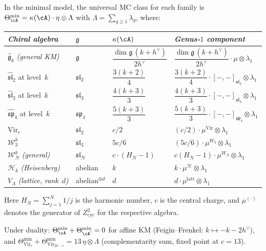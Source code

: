 \begin{corollary}\label{cor:explicit-theta-specializations}
In the minimal model, the universal MC class for each family is
$\Theta^{\min}_{\cA} = \kappa(\cA) \cdot \eta \otimes \Lambda$
with $\Lambda = \sum_{g\geq 1}\lambda_g$, where:
\begin{center}
\begin{tabular}{llll}
\toprule
\emph{Chiral algebra} & $\mathfrak{g}$ &
$\kappa(\cA)$ & \emph{Genus-$1$ component} \\
\midrule
$\widehat{\mathfrak{g}}_k$ \emph{(general KM)} &
$\mathfrak{g}$ &
$\dfrac{\dim\mathfrak{g}\,(k+h^\vee)}{2h^\vee}$ &
$\dfrac{\dim\mathfrak{g}\,(k+h^\vee)}{2h^\vee}
\cdot \mu \otimes \lambda_1$ \\[6pt]
$\widehat{\mathfrak{sl}}_2$ at level~$k$ &
$\mathfrak{sl}_2$ &
$\dfrac{3(k+2)}{4}$ &
$\dfrac{3(k+2)}{4}\cdot[-,-]_{\mathfrak{sl}_2}\otimes\lambda_1$ \\[6pt]
$\widehat{\mathfrak{sl}}_3$ at level~$k$ &
$\mathfrak{sl}_3$ &
$\dfrac{4(k+3)}{3}$ &
$\dfrac{4(k+3)}{3}\cdot[-,-]_{\mathfrak{sl}_3}\otimes\lambda_1$ \\[6pt]
$\widehat{\mathfrak{sp}}_4$ at level~$k$ &
$\mathfrak{sp}_4$ &
$\dfrac{5(k+3)}{3}$ &
$\dfrac{5(k+3)}{3}\cdot[-,-]_{\mathfrak{sp}_4}\otimes\lambda_1$ \\[6pt]
$\mathrm{Vir}_c$ & $\mathfrak{sl}_2$ &
$c/2$ &
$(c/2)\cdot\mu^{\mathrm{Vir}}\otimes\lambda_1$ \\[6pt]
$\mathcal{W}_3^k$ & $\mathfrak{sl}_3$ &
$5c/6$ &
$(5c/6)\cdot\mu^{W_3}\otimes\lambda_1$ \\[6pt]
$\mathcal{W}_N^k$ \emph{(general)} &
$\mathfrak{sl}_N$ &
$c\!\cdot\!(H_N - 1)$ &
$c(H_N-1)\cdot\mu^{W_N}\otimes\lambda_1$ \\[6pt]
$\mathcal{H}_k$ \emph{(Heisenberg)} &
abelian &
$k$ &
$k\cdot\mu^{\mathcal{H}}\otimes\lambda_1$ \\[6pt]
$V_\Lambda$ \emph{(lattice, rank~$d$)} &
abelian$^{\oplus d}$ &
$d$ &
$d\cdot\mu^{\mathrm{latt}}\otimes\lambda_1$ \\
\bottomrule
\end{tabular}
\end{center}
Here $H_N = \sum_{j=1}^N 1/j$ is the harmonic number,
$c$ is the central charge, and $\mu^{(\cdot)}$ denotes the
generator of $Z^2_{\mathrm{cyc}}$ for the respective algebra.

Under duality:
$\Theta_{\cA}^{\min} + \Theta_{\cA^!}^{\min} = 0$
for affine KM \textup{(}Feigin--Frenkel:
$k \mapsto -k - 2h^\vee$\textup{)}, and
$\Theta^{\min}_{\mathrm{Vir}_c} +
\Theta^{\min}_{\mathrm{Vir}_{26-c}} = 13\,\eta\otimes\Lambda$
\textup{(}complementarity sum, fixed point at $c = 13$\textup{)}.
\end{corollary}

